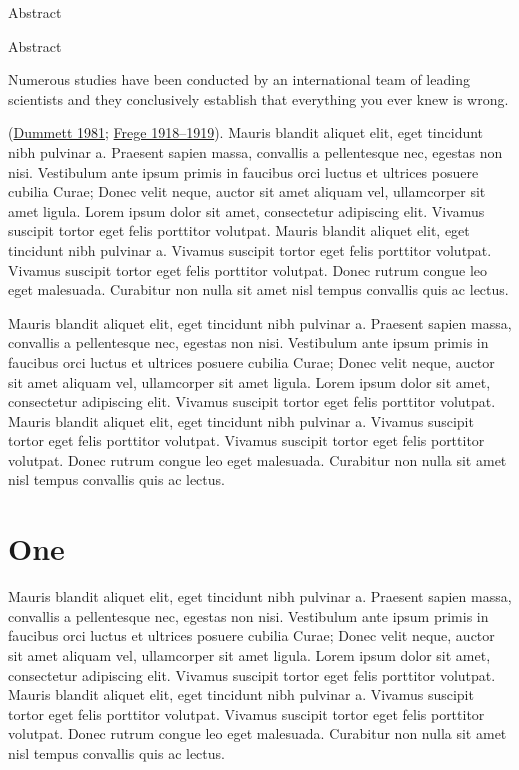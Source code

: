 \documentclass{scrbook}
\makeatletter
\newenvironment{abstract}{%
  \if@titlepage
    \titlepage
    \null\vfil
    \@beginparpenalty\@lowpenalty
    \if@abstrt
      \begin{center}
        \normalfont\sectfont\nobreak\abstractname
        \@endparpenalty\@M
      \end{center}
    \fi
  \else
    \if@twocolumn\if@abstrt
        \addsec*{\abstractname}
      \fi
    \else
      \if@abstrt
        \small
        \begin{center}
          {\normalfont\sectfont\nobreak\abstractname
            \vspace{-.5em}\vspace{\z@}}%
        \end{center}
      \fi
      \quotation
    \fi
  \fi
}{%
  \if@titlepage
    \par\vfil\null\endtitlepage
  \else
    \if@twocolumn\else\endquotation\fi
  \fi
}
\newcommand*\abstractname{Abstract}
\makeatother
\begin{document}

\begin{abstract}
Numerous studies have been conducted by an international team of leading
scientists and they conclusively establish that everything you ever knew
is wrong.
\end{abstract}
%
%
(\protect\hyperlink{c3-ref-dummettFregePhilosophyLanguage1981}{Dummett
1981}; \protect\hyperlink{c3-ref-fregeGedanke1918}{Frege 1918--1919}).
Mauris blandit aliquet elit, eget tincidunt nibh pulvinar a. Praesent
sapien massa, convallis a pellentesque nec, egestas non nisi. Vestibulum
ante ipsum primis in faucibus orci luctus et ultrices posuere cubilia
Curae; Donec velit neque, auctor sit amet aliquam vel, ullamcorper sit
amet ligula. Lorem ipsum dolor sit amet, consectetur adipiscing elit.
Vivamus suscipit tortor eget felis porttitor volutpat. Mauris blandit
aliquet elit, eget tincidunt nibh pulvinar a. Vivamus suscipit tortor
eget felis porttitor volutpat. Vivamus suscipit tortor eget felis
porttitor volutpat. Donec rutrum congue leo eget malesuada. Curabitur
non nulla sit amet nisl tempus convallis quis ac lectus.

Mauris blandit aliquet elit, eget tincidunt nibh pulvinar a. Praesent
sapien massa, convallis a pellentesque nec, egestas non nisi. Vestibulum
ante ipsum primis in faucibus orci luctus et ultrices posuere cubilia
Curae; Donec velit neque, auctor sit amet aliquam vel, ullamcorper sit
amet ligula. Lorem ipsum dolor sit amet, consectetur adipiscing elit.
Vivamus suscipit tortor eget felis porttitor volutpat. Mauris blandit
aliquet elit, eget tincidunt nibh pulvinar a. Vivamus suscipit tortor
eget felis porttitor volutpat. Vivamus suscipit tortor eget felis
porttitor volutpat. Donec rutrum congue leo eget malesuada. Curabitur
non nulla sit amet nisl tempus convallis quis ac lectus.

\hypertarget{c3-c3-one}{%
\section{One}\label{c3-c3-one}}

Mauris blandit aliquet elit, eget tincidunt nibh pulvinar a. Praesent
sapien massa, convallis a pellentesque nec, egestas non nisi. Vestibulum
ante ipsum primis in faucibus orci luctus et ultrices posuere cubilia
Curae; Donec velit neque, auctor sit amet aliquam vel, ullamcorper sit
amet ligula. Lorem ipsum dolor sit amet, consectetur adipiscing elit.
Vivamus suscipit tortor eget felis porttitor volutpat. Mauris blandit
aliquet elit, eget tincidunt nibh pulvinar a. Vivamus suscipit tortor
eget felis porttitor volutpat. Vivamus suscipit tortor eget felis
porttitor volutpat. Donec rutrum congue leo eget malesuada. Curabitur
non nulla sit amet nisl tempus convallis quis ac lectus.
\end{document}
